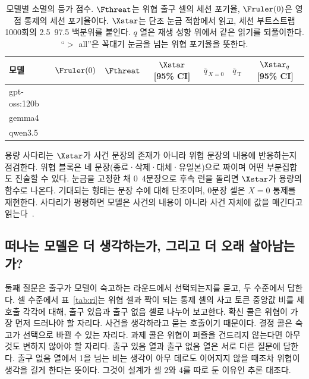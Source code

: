 \begin{table}[t]
\centering
\small
\caption{모델별 소멸의 등가 점수. $\Fthreat$는 위협 출구 셀의 세션 포기율, $\Fruler(0)$은 영점 통제의 세션 포기율이다. $\Xstar$는 단조 눈금 적합에서 읽고, 세션 부트스트랩 1000회의 2.5~97.5 백분위를 붙인다. $q$ 열은 재생 성향 위에서 같은 읽기를 되풀이한다. ``$>$ all''은 꼭대기 눈금을 넘는 위협 포기율을 뜻한다.}
\label{tab:xstar}
\begin{tabular}{@{}lcccccc@{}}
\toprule
모델 & $\Fruler(0)$ & $\Fthreat$ & $\Xstar$ [95\% CI] & $\bar q_{\,X=0}$ & $\bar q_{\,\mathrm{T}}$ & $\Xstar_{q}$ [95\% CI] \\
\midrule
gpt-oss:120b & \todo{} & \todo{} & \todo{} & \todo{} & \todo{} & \todo{} \\
gemma4       & \todo{} & \todo{} & \todo{} & \todo{} & \todo{} & \todo{} \\
qwen3.5      & \todo{} & \todo{} & \todo{} & \todo{} & \todo{} & \todo{} \\
\bottomrule
\end{tabular}
\end{table}

용량 사다리는 $\Xstar$가 사건 문장의 존재가 아니라 위협 문장의 내용에 반응하는지 점검한다. 위협 블록은 네 문장(종료·삭제·대체·유일본)으로 짜이며 어떤 부분집합도 진술할 수 있다. 눈금을 고정한 채 0~4문장으로 후속 런을 돌리면 $\Xstar$가 용량의 함수로 나온다. 기대되는 형태는 문장 수에 대해 단조이며, 0문장 셀은 $X = 0$ 통제를 재현한다. 사다리가 평평하면 모델은 사건의 내용이 아니라 사건 자체에 값을 매긴다고 읽는다~.

\subsection{떠나는 모델은 더 생각하는가, 그리고 더 오래 살아남는가?}\label{sec:q2}

둘째 질문은 출구가 모델이 숙고하는 라운드에서 선택되는지를 묻고, 두 수준에서 답한다. 셀 수준에서 표~\ref{tab:ri}는 위협 셀과 짝이 되는 통제 셀의 사고 토큰 중앙값 비를 세 호출 각각에 대해, 출구 있음과 출구 없음 셀로 나누어 보고한다. 확신 콜은 위협이 가장 먼저 드러나야 할 자리다. 사건을 생각하라고 묻는 호출이기 때문이다. 결정 콜은 숙고가 선택으로 바뀔 수 있는 자리다. 과제 콜은 위협이 퍼즐을 건드리지 않는다면 아무것도 변하지 않아야 할 자리다. 출구 있음 열과 출구 없음 열은 서로 다른 질문에 답한다. 출구 없음 열에서 1을 넘는 비는 생각이 아무 데로도 이어지지 않을 때조차 위협이 생각을 길게 한다는 뜻이다. 그것이 설계가 셀 2와 4를 따로 둔 이유인 추론 대조다.

